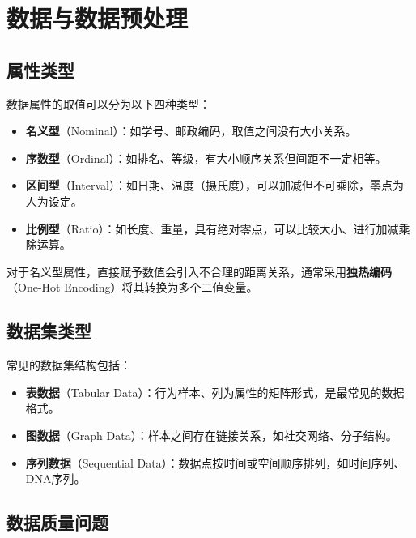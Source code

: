 \documentclass[
]{book}
\providecommand{\tightlist}{%
  \setlength{\itemsep}{0pt}\setlength{\parskip}{0pt}}
\begin{document}
\section{数据与数据预处理}\label{ux6570ux636eux4e0eux6570ux636eux9884ux5904ux7406}

\subsection{属性类型}\label{ux5c5eux6027ux7c7bux578b}

数据属性的取值可以分为以下四种类型：

\begin{itemize}
\tightlist
\item
  \textbf{名义型}（Nominal）：如学号、邮政编码，取值之间没有大小关系。
\item
  \textbf{序数型}（Ordinal）：如排名、等级，有大小顺序关系但间距不一定相等。
\item
  \textbf{区间型}（Interval）：如日期、温度（摄氏度），可以加减但不可乘除，零点为人为设定。
\item
  \textbf{比例型}（Ratio）：如长度、重量，具有绝对零点，可以比较大小、进行加减乘除运算。
\end{itemize}

对于名义型属性，直接赋予数值会引入不合理的距离关系，通常采用\textbf{独热编码}（One-Hot Encoding）将其转换为多个二值变量。

\subsection{数据集类型}\label{ux6570ux636eux96c6ux7c7bux578b}

常见的数据集结构包括：

\begin{itemize}
\tightlist
\item
  \textbf{表数据}（Tabular Data）：行为样本、列为属性的矩阵形式，是最常见的数据格式。
\item
  \textbf{图数据}（Graph Data）：样本之间存在链接关系，如社交网络、分子结构。
\item
  \textbf{序列数据}（Sequential Data）：数据点按时间或空间顺序排列，如时间序列、DNA序列。
\end{itemize}

\subsection{数据质量问题}\label{ux6570ux636eux8d28ux91cfux95eeux9898}
\end{document}
